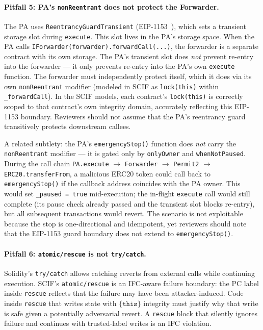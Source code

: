 \documentclass[11pt,a4paper]{article}
\begin{document}
\paragraph{Pitfall 5: PA's \texttt{nonReentrant} does not protect the Forwarder.}
The PA uses \texttt{ReentrancyGuardTransient} (EIP-1153~\cite{eip1153}), which
sets a transient storage slot during \texttt{execute}. This slot lives in the
PA's storage space. When the PA calls
\texttt{IForwarder(forwarder).forwardCall(...)}, the forwarder is a separate
contract with its own storage. The PA's transient slot does \emph{not} prevent
re-entry into the forwarder --- it only prevents re-entry into the PA's own
\texttt{execute} function. The forwarder must independently protect itself,
which it does via its own \texttt{nonReentrant} modifier (modeled in SCIF as
\texttt{lock(this)} within \texttt{\_forwardCall}). In the SCIF models, each
contract's \texttt{lock(this)} is correctly scoped to that contract's own
integrity domain, accurately reflecting this EIP-1153 boundary. Reviewers
should not assume that the PA's reentrancy guard transitively protects
downstream callees.

A related subtlety: the PA's \texttt{emergencyStop()} function does
\emph{not} carry the \texttt{nonReentrant} modifier --- it is gated only by
\texttt{onlyOwner} and \texttt{whenNotPaused}.  During the call chain
\texttt{PA.execute} $\to$ \texttt{Forwarder} $\to$ \texttt{Permit2} $\to$
\texttt{ERC20.transferFrom}, a malicious ERC20 token could call back to
\texttt{emergencyStop()} if the callback address coincides with the PA
owner.  This would set \texttt{\_paused\,=\,true} mid-execution; the
in-flight \texttt{execute} call would still complete (its pause check
already passed and the transient slot blocks re-entry), but all subsequent
transactions would revert.  The scenario is not exploitable because the
stop is one-directional and idempotent, yet reviewers should note that the
EIP-1153 guard boundary does not extend to \texttt{emergencyStop()}.

\paragraph{Pitfall 6: \texttt{atomic/rescue} is not \texttt{try/catch}.}
Solidity's \texttt{try/catch} allows catching reverts from external calls while
continuing execution. SCIF's \texttt{atomic/rescue} is an IFC-aware failure
boundary: the PC label inside \texttt{rescue} reflects that the failure may have
been attacker-induced. Code inside \texttt{rescue} that writes state with
$\{\texttt{this}\}$ integrity must justify why that write is safe given a
potentially adversarial revert. A \texttt{rescue} block that silently ignores
failure and continues with trusted-label writes is an IFC violation.
\end{document}
